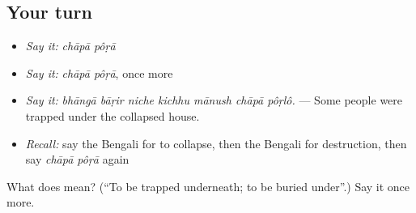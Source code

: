 \subsection*{Your turn}
\begin{itemize}
\raggedright
  \item \emph{Say it:} \emph{chāpā pôṛā}
  \item \emph{Say it:} \emph{chāpā pôṛā}, once more
  \item \emph{Say it:} \emph{bhāngā bāṛir niche kichhu mānush chāpā pôṛlô.} — Some people were trapped under the collapsed house.
  \item \emph{Recall:} say the Bengali for to collapse, then the Bengali for destruction, then say \emph{chāpā pôṛā} again
\end{itemize}

\begin{tcolorbox}[breakable,colback=teal!4,colframe=teal!35!black,title={Before you move on}]
What does   mean? (\textquotedblleft{}To be trapped underneath; to be buried under\textquotedblright{}.) Say it once more.
\end{tcolorbox}
